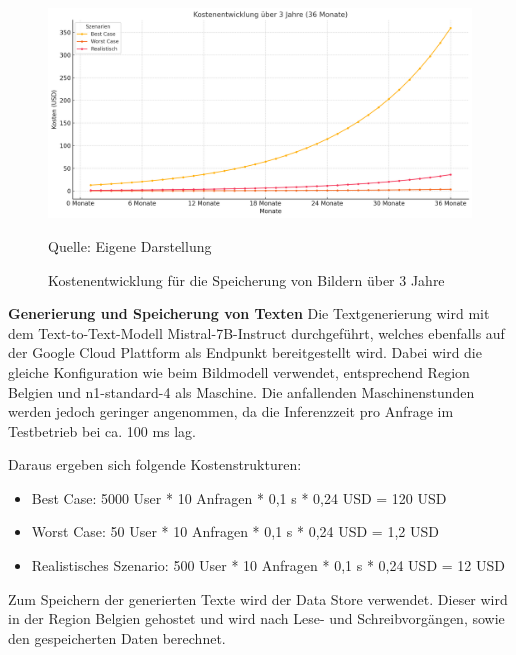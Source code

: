 \begin{figure}[htbp]
    \includegraphics[width=\textwidth, height=\textheight, keepaspectratio]{abbildungen/KostenSpeicher}
    \caption{Kostenentwicklung für die Speicherung von Bildern über 3 Jahre}
    \label{fig:KostenentwicklungSpeicher}
    \raggedright Quelle: Eigene Darstellung
\end{figure}

\textbf{Generierung und Speicherung von Texten}\newline
Die Textgenerierung wird mit dem Text-to-Text-Modell Mistral-7B-Instruct durchgeführt, welches ebenfalls auf der Google Cloud Plattform als Endpunkt bereitgestellt wird.
Dabei wird die gleiche Konfiguration wie beim Bildmodell verwendet, entsprechend Region Belgien und n1-standard-4 als Maschine.
Die anfallenden Maschinenstunden werden jedoch geringer angenommen, da die Inferenzzeit pro Anfrage im Testbetrieb bei ca. 100 ms lag.

Daraus ergeben sich folgende Kostenstrukturen:
\begin{itemize}
    \item Best Case: 5000 User * 10 Anfragen * 0,1 s * 0,24 USD = 120 USD
    \item Worst Case: 50 User * 10 Anfragen * 0,1 s * 0,24 USD = 1,2 USD
    \item Realistisches Szenario: 500 User * 10 Anfragen * 0,1 s * 0,24 USD = 12 USD
\end{itemize}

Zum Speichern der generierten Texte wird der Data Store verwendet.
Dieser wird in der Region Belgien gehostet und wird nach Lese- und Schreibvorgängen, sowie den gespeicherten Daten berechnet.

